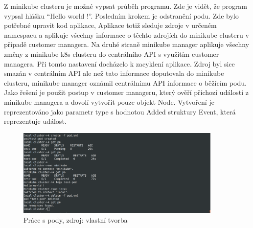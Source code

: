 			  Z minikube clusteru je možné vypsat průběh programu. Zde je vidět, že program vypsal hlášku “Hello world !”. Posledním krokem je odstranění podu. Zde bylo potřebné upravit kod aplikace, Aplikace totiž sleduje zdroje v určeném namespacu a aplikuje všechny informace o těchto zdrojích do minikube clusteru v případě customer managera. Na druhé straně minikube manager aplikuje všechny změny z minikube k8s clusteru do centrálního API s využitím customer managera. Při tomto nastavení docházelo k zacyklení aplikace. Zdroj byl sice smazán v centrálním API ale než tato informace doputovala do minikube clusteru, minikube manager oznámil centrálnímu API informace o běžícím podu. Jako řešení je použit postup v customer manageru, který ověří příchozí události z minikube managera a dovolí vytvořit pouze objekt Node. Vytvoření je reprezentováno jako parametr type s hodnotou Added struktury Event, která reprezentuje událost. 
			   
\begin{figure}[H]
  \begin{centering}
    
	  \includegraphics[width=0.9\textwidth]{images/pod.png}
    \par
	  \caption{Práce s pody\label{fig:pod}, zdroj: vlastní tvorba}
    \end{centering}
\end{figure}


